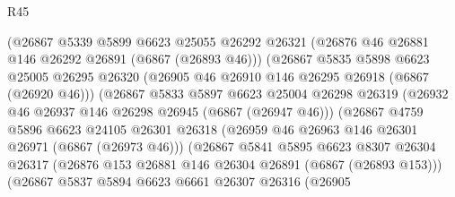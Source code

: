 \begin{lexlean}{R45}
\begin{coremodule}
{                              (@26867
                                @5339
                                @5899
                                @6623
                                @25055
                                @26292
                                @26321
                                (@26876 @46 @26881 @146 @26292 @26891 (@6867 (@26893 @46)))
                                (@26867
                                  @5835
                                  @5898
                                  @6623
                                  @25005
                                  @26295
                                  @26320
                                  (@26905 @46 @26910 @146 @26295 @26918 (@6867 (@26920 @46)))
                                  (@26867
                                    @5833
                                    @5897
                                    @6623
                                    @25004
                                    @26298
                                    @26319
                                    (@26932 @46 @26937 @146 @26298 @26945 (@6867 (@26947 @46)))
                                    (@26867
                                      @4759
                                      @5896
                                      @6623
                                      @24105
                                      @26301
                                      @26318
                                      (@26959 @46 @26963 @146 @26301 @26971 (@6867 (@26973 @46)))
                                      (@26867
                                        @5841
                                        @5895
                                        @6623
                                        @8307
                                        @26304
                                        @26317
                                        (@26876
                                          @153
                                          @26881
                                          @146
                                          @26304
                                          @26891
                                          (@6867 (@26893 @153)))
                                        (@26867
                                          @5837
                                          @5894
                                          @6623
                                          @6661
                                          @26307
                                          @26316
                                          (@26905
}
\end{coremodule}
\end{lexlean}
